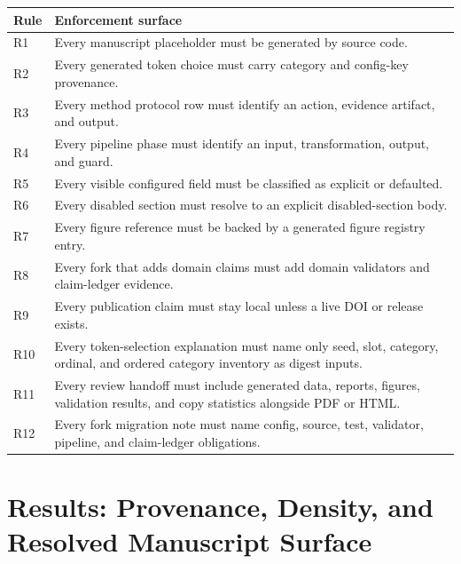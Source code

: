 \documentclass[
  english,
]{article}
\newcounter{none} %
\begin{document}
{\def\LTcaptype{none} %
\begin{longtable}[]{@{}
  >{\raggedright\arraybackslash}p{}
  >{\raggedright\arraybackslash}p{}@{}}
\toprule\noalign{}
\begin{minipage}[b]{\linewidth}\raggedright
Rule
\end{minipage} & \begin{minipage}[b]{\linewidth}\raggedright
Enforcement surface
\end{minipage} \\
\midrule\noalign{}
\endhead
\bottomrule\noalign{}
\endlastfoot
R1 & Every manuscript placeholder must be generated by source code. \\
R2 & Every generated token choice must carry category and config-key
provenance. \\
R3 & Every method protocol row must identify an action, evidence
artifact, and output. \\
R4 & Every pipeline phase must identify an input, transformation,
output, and guard. \\
R5 & Every visible configured field must be classified as explicit or
defaulted. \\
R6 & Every disabled section must resolve to an explicit disabled-section
body. \\
R7 & Every figure reference must be backed by a generated figure
registry entry. \\
R8 & Every fork that adds domain claims must add domain validators and
claim-ledger evidence. \\
R9 & Every publication claim must stay local unless a live DOI or
release exists. \\
R10 & Every token-selection explanation must name only seed, slot,
category, ordinal, and ordered category inventory as digest inputs. \\
R11 & Every review handoff must include generated data, reports,
figures, validation results, and copy statistics alongside PDF or
HTML. \\
R12 & Every fork migration note must name config, source, test,
validator, pipeline, and claim-ledger obligations. \\
\end{longtable}
}

\newpage

\section{Results: Provenance, Density, and Resolved Manuscript
Surface}\label{results-provenance-density-and-resolved-manuscript-surface}
\end{document}
